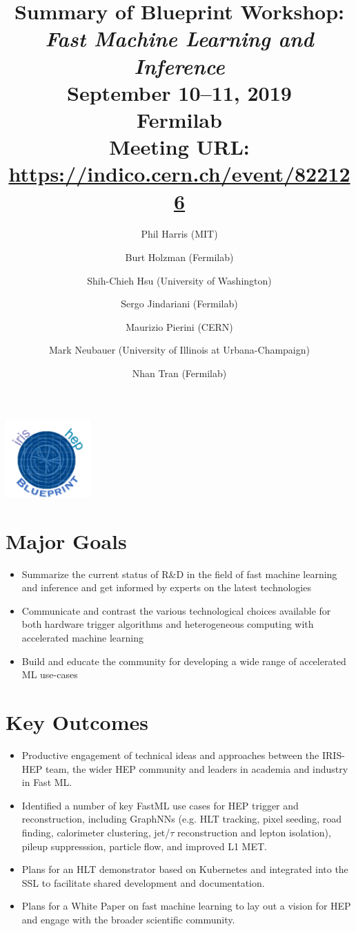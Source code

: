 \documentclass[11pt,letterpaper,fleqn]{article}
\date{} %
\title{\large Summary of Blueprint Workshop: \\
\vspace{1pt}
\LARGE \textit{Fast Machine Learning and Inference} \\
\color{black} \normalsize
\vspace{10pt}
September 10--11, 2019 \\
Fermilab \\
Meeting URL: \href{https://indico.cern.ch/event/822126}{https://indico.cern.ch/event/822126}
} %
\author{Phil Harris {\normalfont(MIT)}
      \and  Burt Holzman {\normalfont(Fermilab)}
      \and  Shih-Chieh Hsu {\normalfont(University of Washington)}
      \and  Sergo Jindariani {\normalfont(Fermilab)}
      \and  Maurizio Pierini {\normalfont(CERN)}
      \and  Mark Neubauer {\normalfont(University of Illinois at Urbana-Champaign)}
      \and  Nhan Tran {\normalfont(Fermilab)}
      }
\begin{document}
\maketitle %
\normalfont

\thispagestyle{firststyle}

\vspace{-420pt}
\hspace{360pt}
\includegraphics[height=30mm]{../../../figures/iris-hep-bluprint-logo.png}

\vspace{290pt}
\section*{Major Goals}
\vspace{3pt}
\begin{itemize}
  \item Summarize the current status of R\&D in the field of fast machine learning and inference and get informed by experts on the latest technologies
  \item Communicate and contrast the various technological choices available for both hardware trigger algorithms and heterogeneous computing with accelerated machine learning
  \item Build and educate the community for developing a wide range of accelerated ML use-cases
\end{itemize}

\section*{Key Outcomes}
\vspace{3pt}
\begin{itemize}
  \item Productive engagement of technical ideas and approaches between the IRIS-HEP team, the wider HEP community and leaders in academia and industry in Fast ML.
  \item Identified a number of key FastML use cases for HEP trigger and reconstruction, including GraphNNs (e.g. HLT tracking, pixel seeding, road finding, calorimeter clustering, jet/$\tau$ reconstruction and lepton isolation), pileup suppresssion, particle flow, and improved L1 MET.
  \item Plans for an HLT demonstrator based on Kubernetes and integrated into the SSL to facilitate shared development and documentation.
  \item Plans for a White Paper on fast machine learning to lay out a vision for HEP and engage with the broader scientific community.
\end{itemize}
\end{document}
